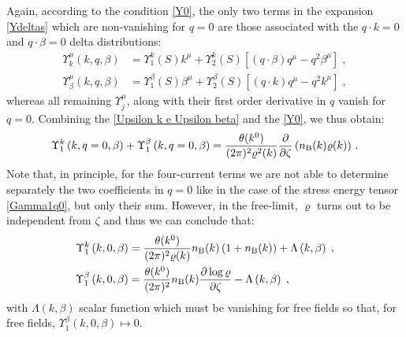 \documentclass[prd,superscriptaddress,nofootinbib,notitlepage]{revtex4-1}
\begin{document}
Again, according to the condition \eqref{Y0}, the only two terms in the expansion \eqref{Ydeltas} which are non-vanishing 
for $q=0$ are those associated with the $q\cdot k=0$ and $q\cdot\beta=0$ delta distributions:
%
\begin{subequations}\label{Upsilon k e Upsilon beta}
    \begin{align}
        \Upsilon^\mu_k\left(k,q,\beta\right) &=\Upsilon^k_1(S)k^\mu+\Upsilon^k_2(S)
    \left[\left(q\cdot\beta\right) q^\mu-q^2\beta^\mu\right]\;,\\
    \Upsilon^\mu_\beta\left(k,q,\beta\right) &=\Upsilon^\beta_1(S)\beta^\mu+\Upsilon^\beta_2(S)
    \left[\left(q\cdot k\right) q^\mu-q^2k^\mu\right]\;,
    \end{align}
\end{subequations}
%
whereas all remaining $\Upsilon^\mu_{j}$, along with their first order derivative in $q$ vanish for $q=0$. 
Combining the \eqref{Upsilon k e Upsilon beta} and the \eqref{Y0}, we thus obtain:
%
\begin{equation}\label{Upsilon 1 in q=0}
 \Upsilon^k_{1}\left(k,q=0,\beta\right)+\Upsilon^{\beta}_1\left(k,q=0,\beta\right) =\frac{\theta(k^0)}{(2\pi)^2\varrho^2(k)}\frac{\partial}{\partial\zeta}\left(n_{\rm B}(k)\varrho(k)\right)\,.
\end{equation}
%
Note that, in principle, for the four-current terms we are not able to determine separately the two coefficients in $q=0$ like in the case of the stress energy tensor \eqref{Gamma1q0}, but only their sum. However, in the free-limit, $\varrho$ turns out to be independent from $\zeta$ and thus we can conclude that:
%
\begin{subequations}\label{Upsilonkbeta q0}
    \begin{align}
        \Upsilon^k_1\left(k,0,\beta\right)&=\frac{\theta(k^0)}{(2\pi)^2\varrho(k)}n_{\rm B}(k)\left(1+n_{\rm B}(k)\right)+\Lambda\left(k,\beta\right)\;,\\
        \Upsilon^\beta_1\left(k,0,\beta\right)&=\frac{\theta(k^0)}{(2\pi)^2}n_{\rm B}(k)\frac{\partial\log\varrho}{\partial\zeta}-\Lambda\left(k,\beta\right)\;,
    \end{align}
\end{subequations}
%
with $\Lambda\left(k,\beta\right)$ scalar function which must be vanishing for free fields so that, for free fields, $\Upsilon^\beta_1\left(k,0,\beta\right)\mapsto0$.
\end{document}
